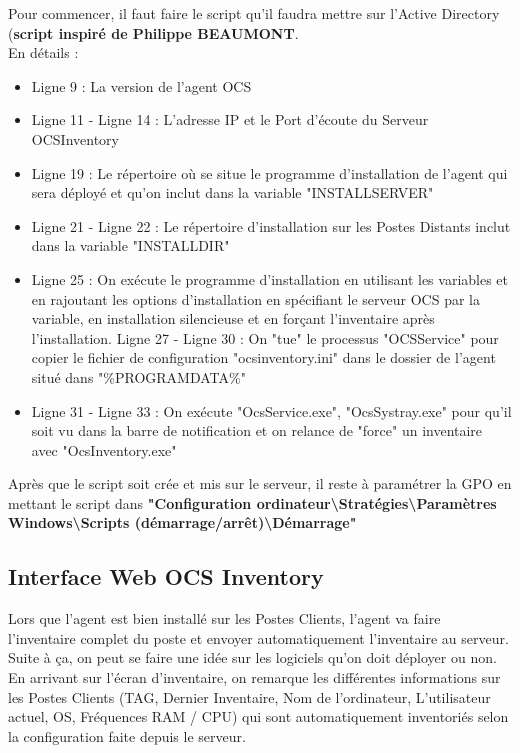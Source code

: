 \documentclass[11pt,a4paper,oneside]{article}
\begin{document}
Pour commencer, il faut faire le script qu'il faudra mettre sur l'Active Directory (\textbf{script inspiré de Philippe BEAUMONT}.\\
En détails : 
\begin{itemize}
\item Ligne 9 : La version de l'agent OCS
\item Ligne 11 - Ligne 14 : L'adresse IP et le Port d'écoute du Serveur OCSInventory
\item Ligne 19 : Le répertoire où se situe le programme d'installation de l'agent qui sera déployé et qu'on inclut dans la variable "INSTALLSERVER"
\item Ligne 21 - Ligne 22 : Le répertoire d'installation sur les Postes Distants inclut dans la variable "INSTALLDIR"
\item Ligne 25 : On exécute le programme d'installation en utilisant les variables et en rajoutant les options d'installation en spécifiant le serveur OCS par la variable, en installation silencieuse et en forçant l'inventaire après l'installation.
Ligne 27 - Ligne 30 : On "tue" le processus "OCSService" pour copier le fichier de configuration "ocsinventory.ini" dans le dossier de l'agent situé dans "\%PROGRAMDATA\%"
\item Ligne 31 - Ligne 33 : On exécute "OcsService.exe", "OcsSystray.exe" pour qu'il soit vu dans la barre de notification et on relance de "force" un inventaire avec "OcsInventory.exe" \\
\end{itemize}
Après que le script soit crée et mis sur le serveur, il reste à paramétrer la GPO en mettant le script dans \textbf{"Configuration ordinateur\textbackslash Stratégies\textbackslash  Paramètres Windows\textbackslash  Scripts (démarrage/arrêt)\textbackslash Démarrage"}
\newpage
\subsection{Interface Web OCS Inventory}
Lors que l'agent est bien installé sur les Postes Clients, l'agent va faire l'inventaire complet du poste et envoyer automatiquement l'inventaire au serveur. Suite à ça, on peut se faire une idée sur les logiciels qu'on doit déployer ou non. \\

En arrivant sur l'écran d'inventaire, on remarque les différentes informations sur les Postes Clients (TAG, Dernier Inventaire, Nom de l'ordinateur, L'utilisateur actuel, OS, Fréquences RAM / CPU) qui sont automatiquement inventoriés selon la configuration faite depuis le serveur.
\end{document}
